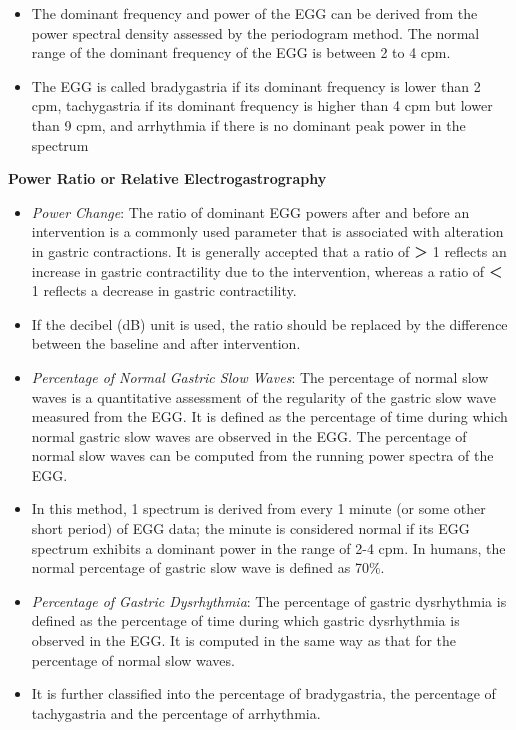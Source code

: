 \documentclass[]{book}
\providecommand{\tightlist}{%
  \setlength{\itemsep}{0pt}\setlength{\parskip}{0pt}}
\begin{document}
\begin{itemize}
\tightlist
\item
  The dominant frequency and power of the EGG can be derived from the
  power spectral density assessed by the periodogram method. The normal
  range of the dominant frequency of the EGG is between 2 to 4 cpm.
\item
  The EGG is called bradygastria if its dominant frequency is lower than
  2 cpm, tachygastria if its dominant frequency is higher than 4 cpm but
  lower than 9 cpm, and arrhythmia if there is no dominant peak power in
  the spectrum
\end{itemize}

\textbf{Power Ratio or Relative Electrogastrography}

\begin{itemize}
\tightlist
\item
  \emph{Power Change}: The ratio of dominant EGG powers after and before
  an intervention is a commonly used parameter that is associated with
  alteration in gastric contractions. It is generally accepted that a
  ratio of ＞ 1 reflects an increase in gastric contractility due to the
  intervention, whereas a ratio of ＜ 1 reflects a decrease in gastric
  contractility.
\item
  If the decibel (dB) unit is used, the ratio should be replaced by the
  difference between the baseline and after intervention.
\item
  \emph{Percentage of Normal Gastric Slow Waves}: The percentage of
  normal slow waves is a quantitative assessment of the regularity of
  the gastric slow wave measured from the EGG. It is defined as the
  percentage of time during which normal gastric slow waves are observed
  in the EGG. The percentage of normal slow waves can be computed from
  the running power spectra of the EGG.
\item
  In this method, 1 spectrum is derived from every 1 minute (or some
  other short period) of EGG data; the minute is considered normal if
  its EGG spectrum exhibits a dominant power in the range of 2-4 cpm. In
  humans, the normal percentage of gastric slow wave is defined as 70\%.
\item
  \emph{Percentage of Gastric Dysrhythmia}: The percentage of gastric
  dysrhythmia is defined as the percentage of time during which gastric
  dysrhythmia is observed in the EGG. It is computed in the same way as
  that for the percentage of normal slow waves.
\item
  It is further classified into the percentage of bradygastria, the
  percentage of tachygastria and the percentage of arrhythmia.
\end{itemize}
\end{document}
